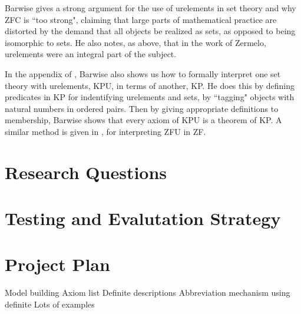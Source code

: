 \documentclass[12pt]{article}
\theoremstyle{definition}
\begin{document}
Barwise \cite{barwise} gives a strong argument for the use of urelements in set theory and why ZFC is ``too strong", claiming that large parts of mathematical practice are distorted by the demand that all objects be realized as sets, as opposed to being isomorphic to sets. He also notes, as above, that in the work of Zermelo, urelements were an integral part of the subject.

In the appendix of \cite{barwise}, Barwise also shows us how to formally interpret one set theory with urelements, KPU, in terms of another, KP. He does this by defining predicates in KP for indentifying urelements and sets, by ``tagging" objects with natural numbers in ordered pairs. %
Then by giving appropriate definitions to membership, Barwise shows that every axiom of KPU is a theorem of KP. A similar method is given in \cite{lowe}, for interpreting ZFU in ZF.

\section{Research Questions}


\section{Testing and Evalutation Strategy}

\section{Project Plan}
Model building
Axiom list
Definite descriptions
Abbreviation mechanism using definite
Lots of examples
\end{document}
